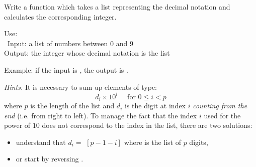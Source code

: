 \documentclass[11pt,class=report,crop=false]{standalone}
\begin{document}


\begin{activite}


Write a function  which takes a list representing the decimal notation and calculates the corresponding integer.
  
  \begin{fonction}
  Use:  \\\
  Input: a list of numbers between $0$ and $9$ \\
  Output: the integer whose decimal notation is the list
  
  \medskip
  Example: if the input is \ci{[1,2,3,4]}, the output is .
  \end{fonction} 
  
  \emph{Hints.}  It is necessary to sum up elements of type:
    $$d_i \times 10^{i} \quad \text{ for } 0 \le i < p$$
    where $p$ is the length of the list and $d_i$ is the digit at index $i$ \emph{counting from the end} (i.e. from right to left). To manage the fact that the index $i$ used for the power of $10$ does not correspond to the index in the list, there are two solutions:
  \begin{itemize}
    \item understand that $d_i = $ $[p-1-i]$ where  is the list of $p$ digits,
    \item or start by reversing \ci{mylist}.    
   \end{itemize}  
  
\end{activite}

\end{document}
